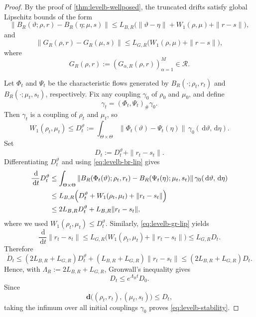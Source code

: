 \documentclass[11pt]{article}
\theoremstyle{definition}
\newcommand{\W}{W_1}
\newcommand{\dd}{\,\mathrm{d}}
\begin{document}
\begin{proof}
By the proof of \cref{thm:levelb-wellposed}, the truncated drifts satisfy global Lipschitz bounds of the form
\begin{equation}
  \|B_R(\vartheta;\rho,r)-B_R(\eta;\mu,s)\|
  \le
  L_{B,R}
  \bigl(
    \|\vartheta-\eta\|
    +
    \W(\rho,\mu)
    +
    \|r-s\|
  \bigr),
  \label{eq:levelb-br-lip}
\end{equation}
and
\begin{equation}
  \|G_R(\rho,r)-G_R(\mu,s)\|
  \le
  L_{G,R}
  \bigl(
    \W(\rho,\mu)
    +
    \|r-s\|
  \bigr),
  \label{eq:levelb-gr-lip}
\end{equation}
where
\[
  G_R(\rho,r):=(G_{\alpha,R}(\rho,r))_{\alpha=1}^M\in \mathcal R.
\]

Let $\Phi_t$ and $\Psi_t$ be the characteristic flows generated by
$B_R(\cdot;\rho_t,r_t)$ and $B_R(\cdot;\mu_t,s_t)$, respectively.
Fix any coupling $\gamma_0$ of $\rho_0$ and $\mu_0$, and define
\[
  \gamma_t=(\Phi_t,\Psi_t)_\#\gamma_0.
\]
Then $\gamma_t$ is a coupling of $\rho_t$ and $\mu_t$, so
\[
  \W(\rho_t,\mu_t)
  \le
  D_t^\vartheta
  :=
  \int_{\Theta\times\Theta}
  \|\Phi_t(\vartheta)-\Psi_t(\eta)\|
  \,\gamma_0(\dd \vartheta,\dd \eta).
\]
Set
\[
  D_t:=D_t^\vartheta+\|r_t-s_t\|.
\]
Differentiating $D_t^\vartheta$ and using \eqref{eq:levelb-br-lip} gives
\begin{align*}
  \frac{\dd}{\dd t}D_t^\vartheta
  &\le
  \int_{\Theta\times\Theta}
  \|B_R(\Phi_t(\vartheta);\rho_t,r_t)-B_R(\Psi_t(\eta);\mu_t,s_t)\|
  \,\gamma_0(\dd \vartheta,\dd \eta)
  \\
  &\le
  L_{B,R}
  \Bigl(
    D_t^\vartheta+\W(\rho_t,\mu_t)+\|r_t-s_t\|
  \Bigr)
  \\
  &\le
  2L_{B,R}D_t^\vartheta+L_{B,R}\|r_t-s_t\|,
\end{align*}
where we used $\W(\rho_t,\mu_t)\le D_t^\vartheta$.
Similarly, \eqref{eq:levelb-gr-lip} yields
\[
  \frac{\dd}{\dd t}\|r_t-s_t\|
  \le
  L_{G,R}\bigl(\W(\rho_t,\mu_t)+\|r_t-s_t\|\bigr)
  \le
  L_{G,R}D_t.
\]
Therefore
\[
  \dot D_t
  \le
  (2L_{B,R}+L_{G,R})D_t^\vartheta+(L_{B,R}+L_{G,R})\|r_t-s_t\|
  \le
  (2L_{B,R}+L_{G,R})D_t.
\]
Hence, with $\Lambda_R:=2L_{B,R}+L_{G,R}$, Gronwall's inequality gives
\[
  D_t\le e^{\Lambda_R t}D_0.
\]
Since
\[
  \mathbf d\bigl((\rho_t,r_t),(\mu_t,s_t)\bigr)
  \le D_t,
\]
taking the infimum over all initial couplings $\gamma_0$ proves \eqref{eq:levelb-stability}.
\end{proof}
\end{document}
